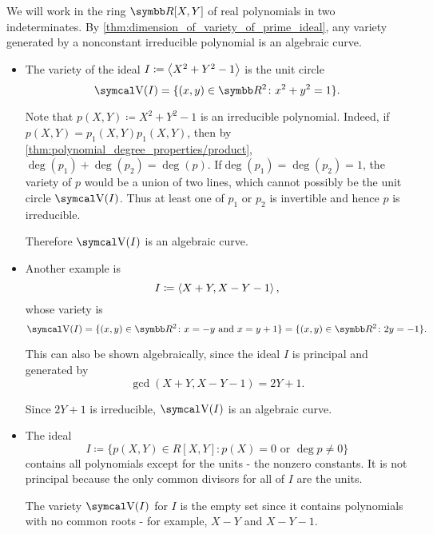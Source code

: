 \begin{example}\label{ex:affine_varieties}
  We will work in the ring \( \R[X, Y] \) of real polynomials in two indeterminates. By \cref{thm:dimension_of_variety_of_prime_ideal}, any variety generated by a nonconstant irreducible polynomial is an algebraic curve.

  \begin{itemize}
    \item The variety of the ideal \( I \coloneqq \left\langle X^2 + Y^2 - 1 \right\rangle \) is the unit circle
    \begin{equation*}
      \V(I) = \{ (x, y) \in \R^2 \colon x^2 + y^2 = 1 \}.
    \end{equation*}

    Note that \( p(X, Y) \coloneqq X^2 + Y^2 - 1 \) is an irreducible polynomial. Indeed, if \( p(X, Y) = p_1(X, Y) p_1(X, Y) \), then by \cref{thm:polynomial_degree_properties/product}, \( \deg(p_1) + \deg(p_2) = \deg(p) \). If\LEM \( \deg(p_1) = \deg(p_2) = 1 \), the variety of \( p \) would be a union of two lines, which cannot possibly be the unit circle \( \V(I) \). Thus at least one of \( p_1 \) or \( p_2 \) is invertible and hence \( p \) is irreducible.

    Therefore \( \V(I) \) is an algebraic curve.

    \item Another example is
    \begin{equation*}
      I \coloneqq \left\langle X + Y, X - Y - 1 \right\rangle,
    \end{equation*}
    whose variety is
    \begin{equation*}
      \V(I) = \{ (x, y) \in \R^2 \colon x = -y \text{ and } x = y + 1 \} = \{ (x, y) \in \R^2 \colon 2y = -1 \}.
    \end{equation*}

    This can also be shown algebraically, since the ideal \( I \) is principal and generated by
    \begin{equation*}
      \gcd(X + Y, X - Y - 1) = 2Y + 1.
    \end{equation*}

    Since \( 2Y + 1 \) is irreducible, \( \V(I) \) is an algebraic curve.

    \item The ideal
    \begin{equation*}
      I \coloneqq \{ p(X, Y) \in R[X, Y] \colon p(X) = 0 \text{ or } \deg p \neq 0 \}
    \end{equation*}
    contains all polynomials except for the units - the nonzero constants. It is not principal because the only common divisors for all of \( I \) are the units.

    The variety \( \V(I) \) for \( I \) is the empty set since it contains polynomials with no common roots - for example, \( X - Y \) and \( X - Y - 1 \).
  \end{itemize}
\end{example}

